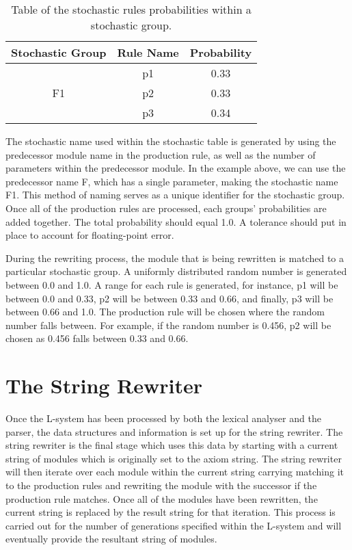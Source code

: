 \begin{table}[h!] \center
\begin{tabular}{ | c | c | c | }
\hline
	Stochastic Group & Rule Name & Probability\\  
\hline
\hline
\multirow{3}{*}{F1} & p1 & 0.33 \\
& p2 & 0.33 \\
& p3 & 0.34 \\
\hline
\end{tabular}
\caption{Table of the stochastic rules probabilities within a stochastic group.}
\label{stochastic table}
\end{table}
\FloatBarrier

The stochastic name used within the stochastic table is generated by using the predecessor module name in the production rule, as well as the number of parameters within the predecessor module. In the example above, we can use the predecessor name F, which has a single parameter, making the stochastic name F1. This method of naming serves as a unique identifier for the stochastic group. Once all of the production rules are processed, each groups' probabilities are added together. The total probability should equal 1.0. A tolerance should put in place to account for floating-point error.

During the rewriting process, the module that is being rewritten is matched to a particular stochastic group. A uniformly distributed random number is generated between 0.0 and 1.0. A range for each rule is generated, for instance, p1 will be between 0.0 and 0.33, p2 will be between 0.33 and 0.66, and finally, p3 will be between 0.66 and 1.0. The production rule will be chosen where the random number falls between. For example, if the random number is 0.456, p2 will be chosen as 0.456 falls between 0.33 and 0.66.

\section{The String Rewriter}

Once the L-system has been processed by both the lexical analyser and the parser, the data structures and information is set up for the string rewriter. The string rewriter is the final stage which uses this data by starting with a current string of modules which is originally set to the axiom string. The string rewriter will then iterate over each module within the current string carrying matching it to the production rules and rewriting the module with the successor if the production rule matches. Once all of the modules have been rewritten, the current string is replaced by the result string for that iteration. This process is carried out for the number of generations specified within the L-system and will eventually provide the resultant string of modules.

